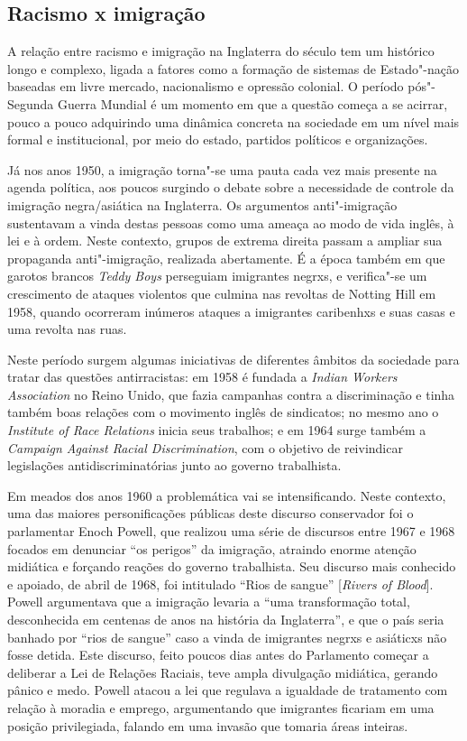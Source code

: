 \subsection{Racismo x imigração}

A relação entre racismo e imigração na Inglaterra do século  tem um histórico longo e complexo, ligada a fatores como a formação de sistemas de Estado"-nação baseadas em livre mercado, nacionalismo e opressão colonial. O período pós"-Segunda Guerra Mundial é um momento em que a questão começa a se acirrar, pouco a pouco adquirindo uma dinâmica concreta na sociedade em um nível mais formal e institucional, por meio do estado, partidos políticos e organizações.

Já nos anos 1950, a imigração torna"-se uma pauta cada vez mais presente na agenda política, aos poucos surgindo o debate sobre a necessidade de controle da imigração negra/asiática na Inglaterra. Os argumentos anti"-imigração sustentavam a vinda destas pessoas como uma ameaça ao modo de vida inglês, à lei e à ordem. Neste contexto, grupos de extrema direita passam a ampliar sua propaganda anti"-imigração, realizada abertamente. É a época também em que garotos brancos \emph{Teddy Boys} perseguiam imigrantes negrxs, e verifica"-se um crescimento de ataques violentos que culmina nas revoltas de Notting Hill em 1958, quando ocorreram inúmeros ataques a imigrantes caribenhxs e suas casas e uma revolta nas ruas.

Neste período surgem algumas iniciativas de diferentes âmbitos da sociedade para tratar das questões antirracistas: em 1958 é fundada a \emph{Indian Workers Association} no Reino Unido, que fazia campanhas contra a discriminação e tinha também boas relações com o movimento inglês de sindicatos; no mesmo ano o \emph{Institute of Race Relations} inicia seus trabalhos; e em 1964 surge também a \emph{Campaign Against Racial Discrimination}, com o objetivo de reivindicar legislações antidiscriminatórias junto ao governo trabalhista.

Em meados dos anos 1960 a problemática vai se intensificando. Neste contexto, uma das maiores personificações públicas deste discurso conservador foi o parlamentar Enoch Powell, que realizou uma série de discursos entre 1967 e 1968 focados em denunciar ``os perigos'' da imigração, atraindo enorme atenção midiática e forçando reações do governo trabalhista. Seu discurso mais conhecido e apoiado, de abril de 1968, foi intitulado ``Rios de sangue'' [\emph{Rivers of Blood}]. Powell argumentava que a imigração levaria a ``uma transformação total, desconhecida em centenas de anos na história da Inglaterra'', e que o país seria banhado por ``rios de sangue'' caso a vinda de imigrantes negrxs e asiáticxs não fosse detida. Este discurso, feito poucos dias antes do Parlamento começar a deliberar a Lei de Relações Raciais, teve ampla divulgação midiática, gerando pânico e medo. Powell atacou a lei que regulava a igualdade de tratamento com relação à moradia e emprego, argumentando que imigrantes ficariam em uma posição privilegiada, falando em uma invasão que tomaria áreas inteiras.

